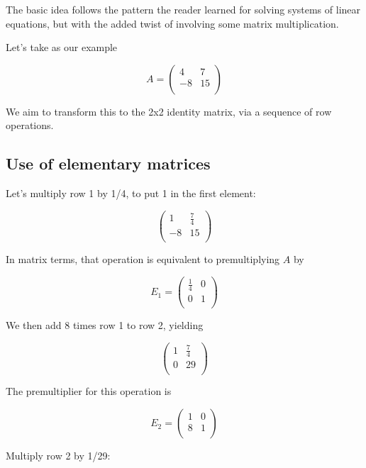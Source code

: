 \documentclass[
  letterpaper,
  DIV=11,
  numbers=noendperiod,
  oneside]{scrreprt}
\begin{document}
The basic idea follows the pattern the reader learned for solving
systems of linear equations, but with the added twist of involving some
matrix multiplication.

Let's take as our example

\[
 A = 
 \left (
 \begin{array}{rr}
 4 & 7 \\
 -8 & 15  \\
 \end{array}
 \right )
 \]

We aim to transform this to the 2x2 identity matrix, via a sequence of
row operations.

\hypertarget{use-of-elementary-matrices}{%
\subsection{Use of elementary
matrices}\label{use-of-elementary-matrices}}

Let's multiply row 1 by 1/4, to put 1 in the first element:

\[
 \left (
 \begin{array}{rr}
 1 & \frac{7}{4} \\
 -8 & 15  \\
 \end{array}
 \right )
 \]

In matrix terms, that operation is equivalent to premultiplying \(A\) by

\[
E_1=
\left (
\begin{array}{rr}
\frac{1}{4} & 0  \\
0 & 1  \\
\end{array}
\right )
\]

We then add 8 times row 1 to row 2, yielding

\[
 \left (
 \begin{array}{rr}
 1 & \frac{7}{4} \\
 0 & 29  \\
 \end{array}
 \right )
 \]

The premultiplier for this operation is

\[
E_2=
\left (
\begin{array}{rr}
1 & 0  \\
8 & 1  \\
\end{array}
\right )
\]

Multiply row 2 by 1/29:
\end{document}
